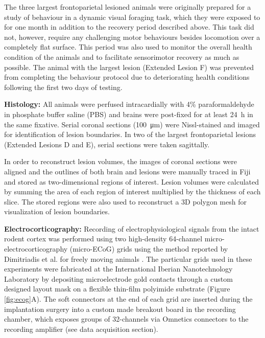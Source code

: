 The three largest frontoparietal lesioned animals were originally prepared for a study of behaviour in a dynamic visual foraging task, which they were exposed to for one month in addition to the recovery period described above. This task did not, however, require any challenging motor behaviours besides locomotion over a completely flat surface. This period was also used to monitor the overall health condition of the animals and to facilitate sensorimotor recovery as much as possible. The animal with the largest lesion (Extended Lesion F) was prevented from completing the behaviour protocol due to deteriorating health conditions following the first two days of testing.

\textbf{Histology:} All animals were perfused intracardially with 4\% paraformal\-dehyde in phosphate buffer saline (PBS) and brains were post-fixed for at least \SI{24}{\hour} in the same fixative. Serial coronal sections (\SI{100}{\micro\meter}) were Nissl-stained and imaged for identification of lesion boundaries. In two of the largest frontoparietal lesions (Extended Lesions D and E), serial sections were taken sagittally.

In order to reconstruct lesion volumes, the images of coronal sections were aligned and the outlines of both brain and lesions were manually traced in Fiji \cite{Schindelin2012} and stored as two-dimensional regions of interest. Lesion volumes were calculated by summing the area of each region of interest multiplied by the thickness of each slice. The stored regions were also used to reconstruct a 3D polygon mesh for visualization of lesion boundaries.

\textbf{Electrocorticography:} Recording of electrophysiological signals from the intact rodent cortex was performed using two high-density 64-channel micro-electrocorticography (micro-ECoG) grids using the method reported by Dimitriadis et al. for freely moving animals \cite{Dimitriadis2014}. The particular grids used in these experiments were fabricated at the International Iberian Nanotechnology Laboratory by depositing microelectrode gold contacts through a custom designed layout mask on a flexible thin-film polyimide substrate (Figure \ref{fig:ecog}A). The soft connectors at the end of each grid are inserted during the implantation surgery into a custom made breakout board in the recording chamber, which exposes groups of 32-channels via Omnetics connectors to the recording amplifier (see data acquisition section).


